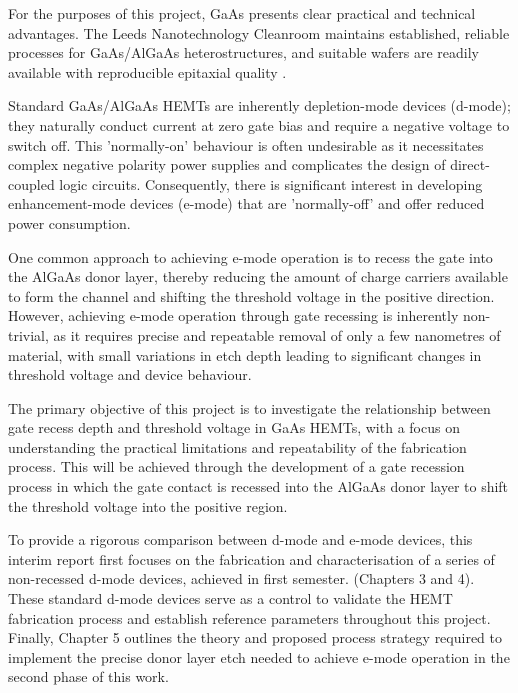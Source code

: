 \vspace{2mm}

For the purposes of this project, GaAs presents clear practical and 
technical advantages. The Leeds Nanotechnology Cleanroom maintains 
established, reliable processes for GaAs/AlGaAs heterostructures, and 
suitable wafers are readily available with reproducible epitaxial 
quality \cite{leedscleanroom}. 

\vspace{2mm}

Standard GaAs/AlGaAs HEMTs are inherently depletion-mode devices (d-mode); 
they naturally conduct current at zero gate bias and require a negative 
voltage to switch off. \cite{mishra2002} This 'normally-on' behaviour is often undesirable 
as it necessitates complex negative polarity power supplies \cite{st_d_mode} and complicates 
the design of direct-coupled logic circuits. \cite{Xie2011}  Consequently, there is 
significant interest in developing enhancement-mode devices (e-mode) that are 
'normally-off' and offer reduced power consumption. 

\vspace{8mm} 

One common approach to achieving e-mode operation is to recess the 
gate into the AlGaAs donor layer, thereby reducing the amount of charge carriers available 
to form the channel and shifting the threshold voltage in the positive direction. \cite{Saitto2006}
However, achieving e-mode operation through gate recessing is inherently non-trivial, as 
it requires precise and repeatable removal of only a few nanometres of material, 
with small variations in etch depth leading to significant changes in 
threshold voltage and device behaviour. \cite{Lanford2005}

\vspace{2mm}

The primary objective of this project is to investigate the relationship 
between gate recess depth and threshold voltage in GaAs HEMTs, with a focus 
on understanding the practical limitations and repeatability of the 
fabrication process. This will be achieved through the development of a gate 
recession process in which the gate contact is recessed into the AlGaAs 
donor layer to shift the threshold voltage into the positive region.

\vspace{2mm}

To provide a rigorous comparison between d-mode and e-mode devices,
this interim report first focuses on the fabrication and characterisation of a series 
of non-recessed d-mode devices, achieved in first semester. (Chapters 3 and 4). 
These standard d-mode devices serve as a control to validate the HEMT fabrication process 
and establish reference parameters throughout this project. 
Finally, Chapter 5 outlines the theory and proposed process strategy 
required to implement the precise donor layer etch needed to achieve 
e-mode operation in the second phase of this work.